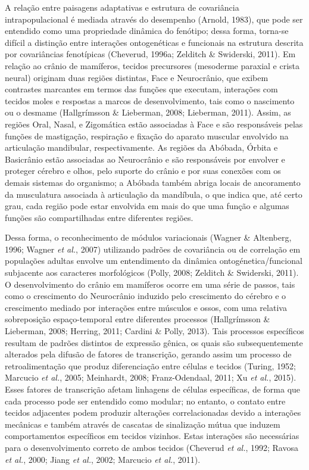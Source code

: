 \documentclass[12pt,twoside]{report}
\begin{document}
A relação entre paisagens adaptativas e estrutura de covariância
intrapopulacional é mediada através do desempenho (Arnold, 1983), que
pode ser entendido como uma propriedade dinâmica do fenótipo; dessa
forma, torna-se difícil a distinção entre interações ontogenéticas e
funcionais na estrutura descrita por covariâncias fenotípicas (Cheverud,
1996a; Zelditch \& Swiderski, 2011). Em relação ao crânio de mamíferos,
tecidos precursores (mesoderme paraxial e crista neural) originam duas
regiões distintas, Face e Neurocrânio, que exibem contrastes marcantes
em termos das funções que executam, interações com tecidos moles e
respostas a marcos de desenvolvimento, tais como o nascimento ou o
desmame (Hallgrímsson \& Lieberman, 2008; Lieberman, 2011). Assim, as
regiões Oral, Nasal, e Zigomática estão associadas à Face e são
responsáveis pelas funções de mastigação, respiração e fixação do
aparato muscular envolvido na articulação mandibular, respectivamente.
As regiões da Abóbada, Órbita e Basicrânio estão associadas ao
Neurocrânio e são responsáveis por envolver e proteger cérebro e olhos,
pelo suporte do crânio e por suas conexões com os demais sistemas do
organismo; a Abóbada também abriga locais de ancoramento da musculatura
associada à articulação da mandíbula, o que indica que, até certo grau,
cada região pode estar envolvida em mais do que uma função e algumas
funções são compartilhadas entre diferentes regiões.

Dessa forma, o reconhecimento de módulos variacionais (Wagner \&
Altenberg, 1996; Wagner \emph{et al.}, 2007) utilizando padrões de
covariância ou de correlação em populações adultas envolve um
entendimento da dinâmica ontogénetica/funcional subjacente aos
caracteres morfológicos (Polly, 2008; Zelditch \& Swiderski, 2011). O
desenvolvimento do crânio em mamíferos ocorre em uma série de passos,
tais como o crescimento do Neurocrânio induzido pelo crescimento do
cérebro e o crescimento mediado por interações entre músculos e ossos,
com uma relativa sobreposição espaço-temporal entre diferentes processos
(Hallgrímsson \& Lieberman, 2008; Herring, 2011; Cardini \& Polly,
2013). Tais processos específicos resultam de padrões distintos de
expressão gênica, os quais são subsequentemente alterados pela difusão
de fatores de transcrição, gerando assim um processo de retroalimentação
que produz diferenciação entre células e tecidos (Turing, 1952; Marcucio
\emph{et al.}, 2005; Meinhardt, 2008; Franz-Odendaal, 2011; Xu \emph{et
al.}, 2015). Esses fatores de transcrição afetam linhagens de células
específicas, de forma que cada processo pode ser entendido como modular;
no entanto, o contato entre tecidos adjacentes podem produzir alterações
correlacionadas devido a interações mecânicas e também através de
cascatas de sinalização mútua que induzem comportamentos específicos em
tecidos vizinhos. Estas interações são necessárias para o
desenvolvimento correto de ambos tecidos (Cheverud \emph{et al.}, 1992;
Ravosa \emph{et al.}, 2000; Jiang \emph{et al.}, 2002; Marcucio \emph{et
al.}, 2011).
\end{document}
